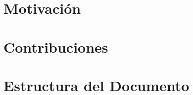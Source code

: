\label{chap:intro}


\section{Motivación}
\label{chap:intro.1}


\section{Contribuciones}
\label{chap:intro.2}

\section{Estructura del Documento}
\label{chap:intro.3}

